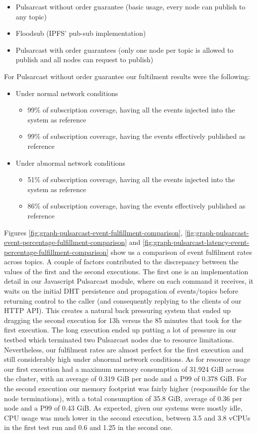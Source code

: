 \begin{itemize}
  \item Pulsarcast without order guarantee (basic usage, every node can publish to any topic)
  \item Floodsub (IPFS' pub-sub implementation)
  \item Pulsarcast with order guarantees (only one node per topic is allowed to publish and all nodes can request to publish)
\end{itemize}

For Pulsarcast without order guarantee our fultilment results were the following:
\begin{itemize}
\item Under normal network conditions
\begin{itemize}
  \item 99\% of subscription coverage, having all the events injected into the system as reference
  \item 99\% of subscription coverage, having the events effectively published as reference
\end{itemize}
\item Under abnormal network conditions
\begin{itemize}
  \item 51\% of subscription coverage, having all the events injected into the system as reference
  \item 86\% of subscription coverage, having the events effectively published as reference
\end{itemize}
\end{itemize}

Figures \ref{fig:graph-pulsarcast-event-fulfillment-comparison},
\ref{fig:graph-pulsarcast-event-percentage-fulfillment-comparison} and
\ref{fig:graph-pulsarcast-latency-event-percentage-fulfillment-comparison} show
us a comparison of event fulfilment rates across topics. A couple of factors
contributed to the discrepancy between the values of the first and the second
executions. The first one is an implementation detail in our Javascript
Pulsarcast module, where on each command it receives, it waits on the initial
DHT persistence and propagation of events/topics before returning control to
the caller (and consequently replying to the clients of our HTTP API). This
creates a natural back pressuring system that ended up dragging the second
execution for 13h versus the 85 minutes that took for the first execution. The
long execution ended up putting a lot of pressure in our testbed which
terminated two Pulsarcast nodes due to resource limitations. Nevertheless, our
fulfilment rates are almost perfect for the first execution and still
considerably high under abnormal network conditions. As for resource usage our
first execution had a maximum memory consumption of 31.924 GiB across the
cluster, with an average of 0.319 GiB per node and a P99 of 0.378 GiB. For the
second execution our memory footprint was fairly higher (responsible for the
node terminations), with a total consumption of 35.8 GiB, average of 0.36 per
node and a P99 of 0.43 GiB. As expected, given our systems were mostly idle,
CPU usage was much lower in the second execution, between 3.5 and 3.8 vCPUs in the
first test run and 0.6 and 1.25 in the second one.

